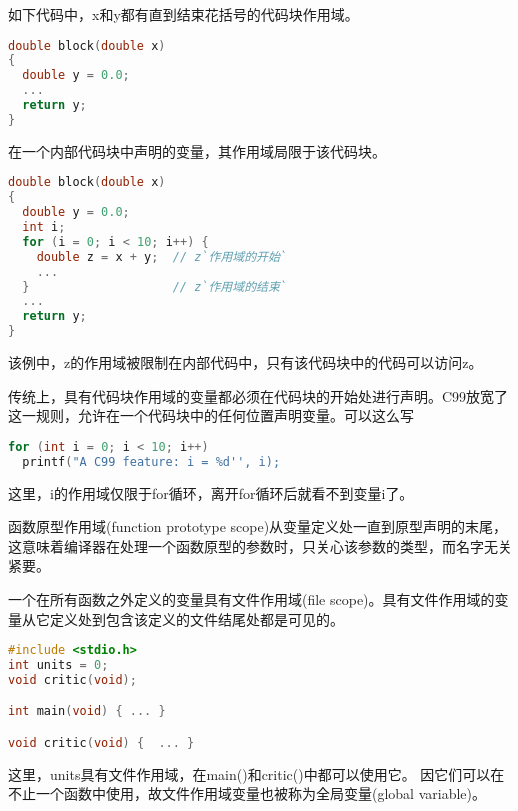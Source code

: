 \begin{frame}[fragile]
  如下代码中，{\tf x}和{\tf y}都有直到结束花括号的代码块作用域。
  \begin{lstlisting}[language=c,frame=single]
double block(double x)
{
  double y = 0.0;
  ...
  return y;
}    
  \end{lstlisting}
\end{frame}

\begin{frame}[fragile]
在一个内部代码块中声明的变量，其作用域局限于该代码块。
\end{frame}

\begin{frame}[fragile]
  \begin{lstlisting}[language=c,frame=single]
double block(double x)
{
  double y = 0.0;
  int i;
  for (i = 0; i < 10; i++) {
    double z = x + y;  // z`作用域的开始`
    ...    
  }                    // z`作用域的结束`
  ...
  return y;
}    
  \end{lstlisting}
  该例中，{\tf z}的作用域被限制在内部代码中，只有该代码块中的代码可以访问z。
\end{frame}

\begin{frame}[fragile]
  传统上，具有代码块作用域的变量都必须在代码块的开始处进行声明。{\tf C99}放宽了这一规则，允许在一个代码块中的任何位置声明变量。可以这么写
  \begin{lstlisting}[language=c,frame=single]
for (int i = 0; i < 10; i++)
  printf("A C99 feature: i = %d'', i);
  \end{lstlisting}
  这里，{\tf i}的作用域仅限于{\tf for}循环，离开{\tf for}循环后就看不到变量{\tf i}了。
\end{frame}

\begin{frame}[fragile]
  函数原型作用域{\tf (function prototype scope)}从变量定义处一直到原型声明的末尾，这意味着编译器在处理一个函数原型的参数时，只关心该参数的类型，而名字无关紧要。
\end{frame}

\begin{frame}[fragile]
  一个在所有函数之外定义的变量具有文件作用域{\tf (file scope)}。具有文件作用域的变量从它定义处到包含该定义的文件结尾处都是可见的。
\end{frame}

\begin{frame}[fragile]
  \begin{lstlisting}[language=c,frame=single]
#include <stdio.h>
int units = 0;
void critic(void);

int main(void) { ... }

void critic(void) {  ... }    
  \end{lstlisting}
这里，{\tf units}具有文件作用域，在{\tf main()}和{\tf critic()}中都可以使用它。
因它们可以在不止一个函数中使用，故\textcolor{acolor1}{文件作用域变量也被称为全局变量{\tf (global variable)}。}
\end{frame}


